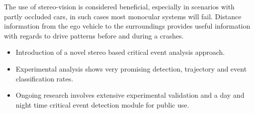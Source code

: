 The use of stereo-vision is considered beneficial, especially in scenarios with partly occluded cars, in such cases most monocular systems will fail. Distance information from the ego vehicle to the surroundings provides useful information with regards to drive patterns before and during a crashes. 
\begin{itemize}
\item Introduction of a novel stereo based critical event analysis approach.
\item Experimental analysis shows very promising detection, trajectory and event classification rates.
\item Ongoing research involves extensive experimental validation and a day and night time critical event detection module for public use.
\end{itemize}



\vspace{4pt}